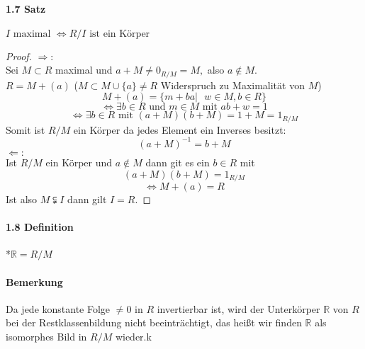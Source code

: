 \documentclass[a4paper]{article}
\begin{document}
\paragraph{1.7 Satz} $ I \text{ maximal } \iff R/I  \text{ ist ein Körper} $
\begin{proof}
      $\Rightarrow:$  \\
      Sei $ M \subset R $ maximal und $ a + M \neq 0_{R/M} = M, $ also $ a \notin M$. \\
      $ R = M + (a) $ ($ M \subset M \cup \{a\} \neq R $ Widerspruch zu Maximalität von $ M $) \\
      $$ M + (a) = \{m + ba | \text{ } w \in M, b \in R\} $$
      $$ \iff \exists b \in R \text{ und } m \in M \text{ mit } ab + w = 1$$ 
      $$ \iff  \exists b \in R \text{ mit } (a + M)(b + M) = 1 + M = 1_{R/M}$$ 
      Somit ist $ R/M $ ein Körper da jedes Element ein Inverses besitzt:
      $$ (a + M)^{-1} = b + M $$
      $\Leftarrow:$ \\
      Ist $ R/M $ ein Körper und $ a \notin M $ dann git es ein $ b \in R $ mit 
      $$ (a + M)(b + M) = 1_{R/M} $$
      $$ \iff M + (a) = R $$  
      Ist also $ M \subsetneqq I $ dann gilt $ I = R $. 
\end{proof}

\paragraph{1.8 Definition}  *$\mathbb{R} = R/M $

\paragraph{Bemerkung} Da jede konstante Folge $ \neq 0 $ in $ R $ invertierbar ist,
wird der Unterkörper $ \mathbb{R} $ von $ R $ bei der Restklassenbildung nicht beeinträchtigt, das heißt
wir finden $ \mathbb{R} $ als isomorphes Bild in $ R/M $ wieder.k
\end{document}

